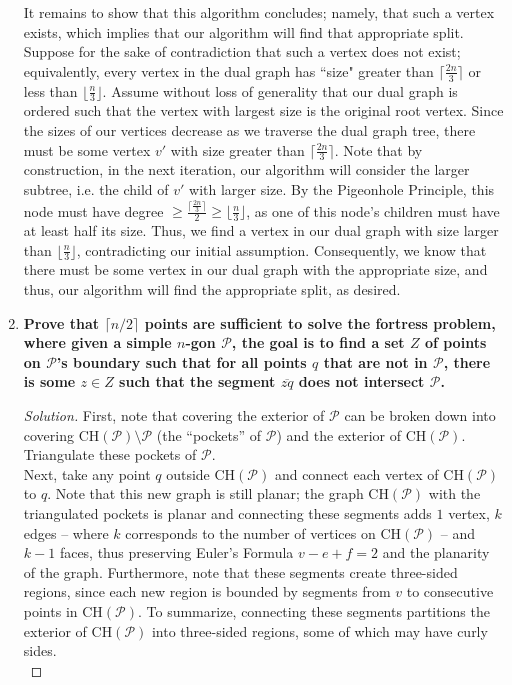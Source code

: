 \documentclass[11pt]{article}
\newcommand{\CH}{\mathrm{CH}}
\newenvironment{solution}
  {\renewcommand\qedsymbol{$\blacksquare$}\begin{proof}[Solution]}
  {\end{proof}}
\begin{document}
\begin{enumerate}
It remains to show that this algorithm concludes; namely, that such a vertex exists, which implies that our algorithm will find that appropriate split. Suppose for the sake of contradiction that such a vertex does not exist; equivalently, every vertex in the dual graph has ``size" greater than $\lceil \frac{2n}{3} \rceil$ or less than $\lfloor \frac{n}{3} \rfloor.$ Assume without loss of generality that our dual graph is ordered such that the vertex with largest size is the original root vertex. Since the sizes of our vertices decrease as we traverse the dual graph tree, there must be some vertex $v'$ with size greater than $\lceil \frac{2n}{3} \rceil.$ Note that by construction, in the next iteration, our algorithm will consider the larger subtree, i.e. the child of $v'$ with larger size. By the Pigeonhole Principle, this node must have degree $\geq \frac{\lceil \frac{2n}{3} \rceil}{2} \geq \lfloor \frac{n}{3} \rfloor$, as one of this node's children must have at least half its size. Thus, we find a vertex in our dual graph with size larger than $\lfloor \frac{n}{3} \rfloor$, contradicting our initial assumption. Consequently, we know that there must be some vertex in our dual graph with the appropriate size, and thus, our algorithm will find the appropriate split, as desired. 
\newpage







\item \textbf{Prove that $\lceil n/2 \rceil$ points are sufficient to solve the fortress problem, where given a simple $n$-gon $\mathcal{P}$, the goal is to find a set $Z$ of points
on $\mathcal{P}$'s boundary such that for all points $q$ that are not in $\mathcal{P}$, there is some $z \in Z$ such that
the segment $\overline{zq}$ does not intersect $\mathcal{P}$.}

\begin{solution}
First, note that covering the exterior of $\mathcal{P}$ can be broken down into covering $\CH(\mathcal{P})\setminus\mathcal{P}$ (the ``pockets'' of $\mathcal{P}$) and the exterior of $\CH(\mathcal{P})$. Triangulate these pockets of $\mathcal{P}$. \\

Next, take any point $q$ outside $\CH(\mathcal{P})$ and connect each vertex of $\CH(\mathcal{P})$ to $q$. Note that this new graph is still planar; the graph $\CH(\mathcal{P})$ with the triangulated pockets is planar and connecting these segments adds $1$ vertex, $k$ edges -- where $k$ corresponds to the number of vertices on $\CH(\mathcal{P})$ -- and $k-1$ faces, thus preserving Euler's Formula $v-e+f = 2$ and the planarity of the graph. Furthermore, note that these segments create three-sided regions, since each new region is bounded by segments from $v$ to consecutive points in $\CH(\mathcal{P}).$ To summarize, connecting these segments partitions the exterior of $\CH(\mathcal{P})$ into three-sided regions, some of which may have curly sides.\\


\end{solution}
\end{enumerate}
\end{document}
